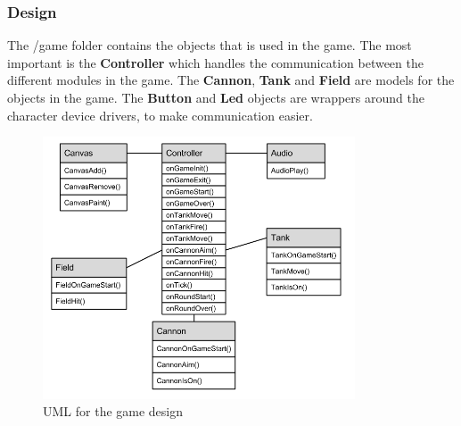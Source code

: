 \subsubsection{Design}

The /game folder contains the objects that is used in the game. The most important is the {\bf Controller}
which handles the communication between the different modules in the game. The {\bf Cannon}, {\bf Tank} and
{\bf Field} are models for the objects in the game. The {\bf Button} and {\bf Led} objects are
wrappers around the character device drivers, to make communication easier.

\begin{figure}[h]
  \includegraphics[width=350px]{graphics/game_UML.png}
  \caption{UML for the game design}
\end{figure}
